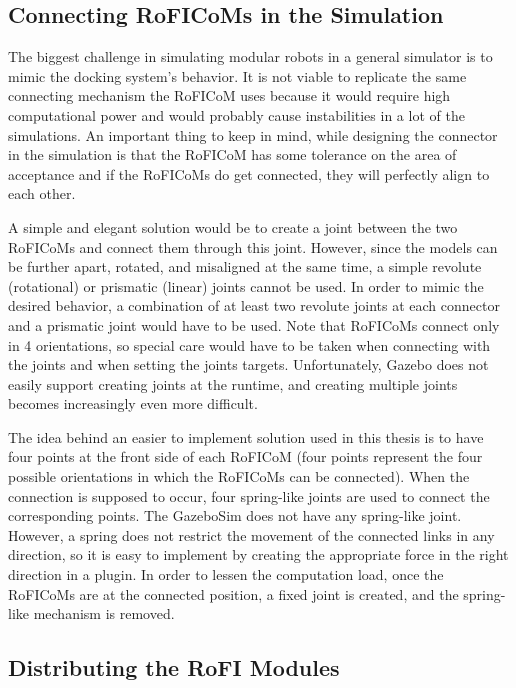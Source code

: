 \documentclass[
  printed, %
  color,   %
  notable, %
  oneside, %
  nolof,   %
  nolot,   %
  nocover,
]{fithesis3}
\begin{document}
\subsection{Connecting RoFICoMs in the Simulation}

The biggest challenge in simulating modular robots in a general simulator is to mimic the docking system's behavior.
It is not viable to replicate the same connecting mechanism the RoFICoM uses because it would require high computational power and would probably cause instabilities in a lot of the simulations.
An important thing to keep in mind, while designing the connector in the simulation is that the RoFICoM has some tolerance\cite{roficom} on the area of acceptance and if the RoFICoMs do get connected, they will perfectly align to each other.

A simple and elegant solution would be to create a joint between the two RoFICoMs and connect them through this joint.
However, since the models can be further apart, rotated, and misaligned at the same time, a simple revolute (rotational) or prismatic (linear) joints cannot be used.
In order to mimic the desired behavior, a combination of at least two revolute joints at each connector and a prismatic joint would have to be used.
Note that RoFICoMs connect only in 4 orientations, so special care would have to be taken when connecting with the joints and when setting the joints targets.
Unfortunately, Gazebo does not easily support creating joints at the runtime, and creating multiple joints becomes increasingly even more difficult.

The idea behind an easier to implement solution used in this thesis is to have four points at the front side of each RoFICoM (four points represent the four possible orientations in which the RoFICoMs can be connected).
When the connection is supposed to occur, four spring-like joints are used to connect the corresponding points.
The GazeboSim does not have any spring-like joint.
However, a spring does not restrict the movement of the connected links in any direction, so it is easy to implement by creating the appropriate force in the right direction in a plugin.
In order to lessen the computation load, once the RoFICoMs are at the connected position, a fixed joint is created, and the spring-like mechanism is removed.

\subsection{Distributing the RoFI Modules}
\end{document}

